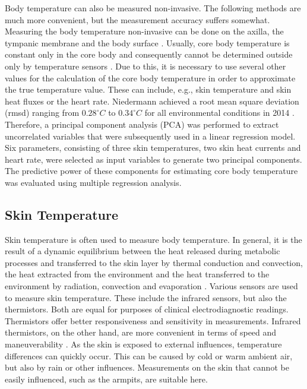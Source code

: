 Body temperature can also be measured non-invasive.
The following methods are much more convenient, but the measurement accuracy suffers somewhat.
Measuring the body temperature non-invasive can be done on the axilla, the tympanic membrane and the body surface \cite{moranCoreTemperatureMeasurement2002a}.
Usually, core body temperature is constant only in the core body and consequently cannot be determined outside only by temperature sensors \cite{niedermannPredictionHumanCore2014}.
Due to this, it is necessary to use several other values for the calculation of the core body temperature in order to approximate the true temperature value. 
These can include, e.g., skin temperature and skin heat fluxes or the heart rate.
Niedermann achieved a root mean square deviation (rmsd) ranging from $0.28 ^\circ C$ to $0.34 ^\circ C$ for all environmental conditions in 2014 \cite{niedermannPredictionHumanCore2014}.
Therefore, a principal component analysis (PCA) was performed to extract uncorrelated variables that were subsequently used in a linear regression model. 
Six parameters, consisting of three skin temperatures, two skin heat currents and heart rate, were selected as input variables to generate two principal components. 
The predictive power of these components for estimating core body temperature was evaluated using multiple regression analysis.

\subsection{Skin Temperature}
\label{Background:BodyTemperature:SkinTemperature}
Skin temperature is often used to measure body temperature.
In general, it is the result of a dynamic equilibrium between the heat released during metabolic processes and transferred to the skin layer by thermal conduction and convection, the heat extracted from the environment and the heat transferred to the environment by radiation, convection and evaporation \cite{dolibogComparativeAnalysisHuman2022}.
Various sensors are used to measure skin temperature. 
These include the infrared sensors, but also the thermistors. 
Both are equal for purposes of clinical electrodiagnostic readings.
Thermistors offer better responsiveness and sensitivity in measurements.
Infrared thermistors, on the other hand, are more convenient in terms of speed and maneuverability \cite{burnhamThreeTypesSkinSurface2006}.
As the skin is exposed to external influences, temperature differences can quickly occur.
This can be caused by cold or warm ambient air, but also by rain or other influences.
Measurements on the skin that cannot be easily influenced, such as the armpits, are suitable here.

